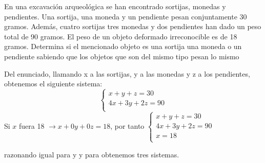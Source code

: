 \documentclass[spanish, 11pt]{exam}
\begin{document}
\begin{questions}
\begin{parts}
\end{parts}

\question En una excavación arqueológica se han encontrado sortijas, monedas y pendientes.  Una sortija, una moneda y un pendiente pesan conjuntamente 30 gramos. Además, cuatro sortijas tres monedas y dos pendientes han dado un peso total de 90 gramos. El peso de un objeto deformado irreconocible es de 18 gramos. Determina si el mencionado objeto es una sortija una moneda o un pendiente sabiendo que los objetos que son del mismo tipo pesan lo mismo

\begin{solution}
    Del enunciado, llamando x a las sortijas, y a las monedas y z a los pendientes,  obtenemos el siguiente sistema: 
    $$\left\{ \begin{matrix}x + y + z = 30 \\ 4 x + 3y +2z = 90 \\ \end{matrix}\right.$$
    Si $x$  fuera 18 $\to x+0y+0z=18$, por tanto $\left\{ \begin{matrix}x + y + z = 30 \\ 4 x + 3y +2z = 90 \\ x = 18 \\ \end{matrix}\right.$

    
    razonando igual para y y para obtenemos tres sistemas.
    

\end{solution}
\end{questions}
\end{document}
